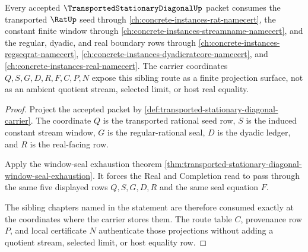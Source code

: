 \begin{theorem}
\label{thm:transported-stationary-diagonal-rat-stream-sibling-link}
Every accepted $\TransportedStationaryDiagonalUp$ packet consumes the transported $\RatUp$ seed through \autoref{ch:concrete-instances-rat-namecert}, the constant finite window through \autoref{ch:concrete-instances-streamname-namecert}, and the regular, dyadic, and real boundary rows through \autoref{ch:concrete-instances-regseqrat-namecert}, \autoref{ch:concrete-instances-dyadicratcore-namecert}, and \autoref{ch:concrete-instances-real-namecert}. The carrier coordinates $Q,S,G,D,R,F,C,P,N$ expose this sibling route as a finite projection surface, not as an ambient quotient stream, selected limit, or host real equality.
\end{theorem}
\begin{proof}
Project the accepted packet by \autoref{def:transported-stationary-diagonal-carrier}. The coordinate $Q$ is the transported rational seed row, $S$ is the induced constant stream window, $G$ is the regular-rational seal, $D$ is the dyadic ledger, and $R$ is the real-facing row.

Apply the window-seal exhaustion theorem \autoref{thm:transported-stationary-diagonal-window-seal-exhaustion}. It forces the Real and Completion read to pass through the same five displayed rows $Q,S,G,D,R$ and the same seal equation $F$.

The sibling chapters named in the statement are therefore consumed exactly at the coordinates where the carrier stores them. The route table $C$, provenance row $P$, and local certificate $N$ authenticate those projections without adding a quotient stream, selected limit, or host equality row.
\end{proof}


\begin{closurestatus}{\TransportedStationaryDiagonalUp}
  \theoryclosure{\seedClosure}
  \formalstatus{\unformalizedV}
\end{closurestatus}
